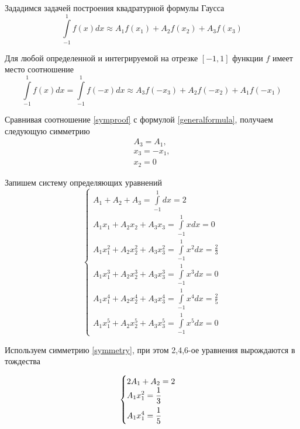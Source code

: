 \documentclass[a4paper, 12pt]{article}
\begin{document}
	Зададимся задачей построения квадратурной формулы Гаусса
	\begin{equation} \label{generalformula}
		\int\limits_{-1}^{1}f(x)dx\approx A_1f(x_1)+A_2f(x_2)+A_3f(x_3)
	\end{equation}
	
	Для любой определенной и интегрируемой на отрезке $[-1,1]$ функции $f$ имеет место соотношение
	\begin{equation} \label{symproof}
		\int\limits_{-1}^{1}f(x)dx=\int\limits_{-1}^{1}f(-x)dx\approx A_3f(-x_3)+A_2f(-x_2)+A_1f(-x_1)
	\end{equation}
	
	Сравнивая соотношение \eqref{symproof} с формулой \eqref{generalformula}, получаем следующую симметрию
	\begin{equation} \label{symmetry}
		\begin{gathered}
			A_3=A_1,\\
			x_3=-x_1,\\
			x_2=0
		\end{gathered}
	\end{equation}

	Запишем систему определяющих уравнений
	\begin{equation}
		\begin{cases}
			\displaystyle
			A_1+A_2+A_3=\int\limits_{-1}^1dx=2\\
			\displaystyle
			A_1x_1+A_2x_2+A_3x_3=\int\limits_{-1}^1xdx=0\\
			\displaystyle
			A_1x_1^2+A_2x_2^2+A_3x_3^2=\int\limits_{-1}^1x^2dx=\frac{2}{3}\\
			\displaystyle
			A_1x_1^3+A_2x_2^3+A_3x_3^3=\int\limits_{-1}^1x^3dx=0\\
			\displaystyle
			A_1x_1^4+A_2x_2^4+A_3x_3^4=\int\limits_{-1}^1x^4dx=\frac{2}{5}\\
			\displaystyle
			A_1x_1^5+A_2x_2^5+A_3x_3^5=\int\limits_{-1}^1x^5dx=0
		\end{cases}
	\end{equation}

	Используем симметрию \eqref{symmetry}, при этом 2,4,6-ое уравнения вырождаются в тождества
	
	\begin{equation}
		\begin{cases}
			2A_1+A_2=2 \\
			\displaystyle \vspace{0.5em}
			A_1x_1^2=\frac{1}{3} \\
			\displaystyle
			A_1x_1^4=\frac{1}{5}
		\end{cases}
	\end{equation}
\end{document}
